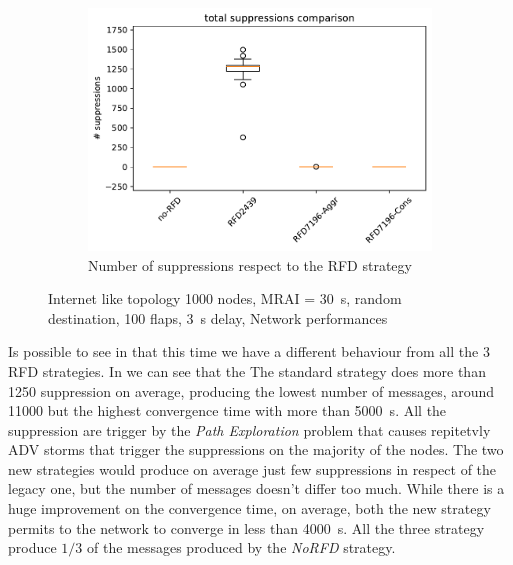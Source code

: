 \begin{figure}[h]
\begin{subfigure}[b]{0.325\textwidth}
     \end{subfigure}
     \hfill
     \begin{subfigure}[b]{0.325\textwidth}
         \centering
         \includegraphics[width=\textwidth]{images/RFD/miceVSelephants/elephants/cisco_1000MRAI30_rfd_comparison_suppressions_boxplot.pdf}
         \caption{Number of suppressions respect to the RFD strategy}
         \label{fig:1000_RFD_MRAI_30_suppressions_elephant}
     \end{subfigure}
		\caption{Internet like topology \num{1000} nodes, \ac{MRAI} = \SI{30}{\second}, random destination, \num{100} flaps, \SI{3}{\second} delay, Network performances}
        \label{fig:1000_RFD_MRAI_30_elephant}
\end{figure}

Is possible to see in  that this time we have
a different behaviour from all the \num{3} \ac{RFD} strategies.
In  we can see that the
The standard strategy does more than \num{1250} suppression on average, producing 
the lowest number of messages, around \num{11000} but the highest convergence
time with more than \SI{5000}{\second}.
All the suppression are trigger by the \textit{Path Exploration} problem that 
causes repitetvly \ac{ADV} storms that trigger the suppressions on the majority
of the nodes.
The two new strategies would produce on average just few suppressions in respect
of the legacy one, but the number of messages doesn't differ too much.
While there is a huge improvement on the convergence time, on average,
both the new strategy permits to the network to converge in less than \SI{4000}{\second}.
All the three strategy produce $1/3$ of the messages produced by the 
\textit{NoRFD} strategy.

